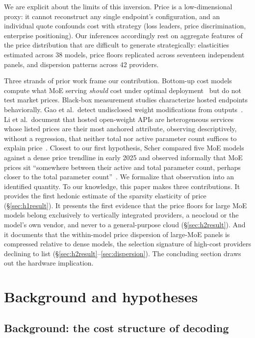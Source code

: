 \documentclass[11pt]{article}
\begin{document}
We are explicit about the limits of this inversion. Price is a low-dimensional
proxy: it cannot reconstruct any single endpoint's configuration, and an
individual quote confounds cost with strategy (loss leaders, price
discrimination, enterprise positioning). Our inferences accordingly rest on
aggregate features of the price distribution that are difficult to generate
strategically: elasticities estimated across 38 models, price floors
replicated across seventeen independent panels, and dispersion patterns
across 42 providers.

Three strands of prior work frame our contribution. Bottom-up cost models
compute what MoE serving \emph{should} cost under optimal
deployment~\cite{r24,r7} but do not test market prices. Black-box measurement studies characterize hosted endpoints behaviorally. Gao et al.\ detect undisclosed weight modifications from outputs~\cite{r23}. Li et al.\ document that hosted open-weight APIs are heterogeneous services whose listed prices are their most anchored attribute, observing descriptively, without a regression, that neither total nor active parameter count suffices to explain price~\cite{r22}. Closest to our first hypothesis, Scher compared five MoE
models against a dense price trendline in early 2025 and observed informally
that MoE prices sit ``somewhere between their active and total parameter
count, perhaps closer to the total parameter count''~\cite{r21}. We formalize
that observation into an identified quantity. To our knowledge, this paper
makes three contributions. It provides the first hedonic estimate of the sparsity elasticity of price (\S\ref{sec:h1result}). It presents the first evidence that the price floors for large MoE models belong exclusively to vertically integrated providers, a neocloud or the model's own vendor, and never to a general-purpose cloud (\S\ref{sec:h2result}). And it documents that the within-model price dispersion of large-MoE panels is compressed relative to dense models, the selection signature of high-cost providers declining to list (\S\ref{sec:h2result}--\ref{sec:dispersion}). The concluding section draws out
the hardware implication.

\section{Background and hypotheses}

\subsection{Background: the cost structure of decoding}
\label{sec:background}
\end{document}
